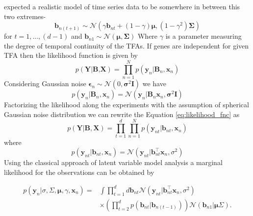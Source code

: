 \cite{Sanguinetti:2006}  expected a realistic model of time series data to be somewhere in between this two extremes-
\begin{equation} \label{eq:tfa_SanG_update}
  \textbf{b}_{n(t+1)} \sim \mathcal{N} (\gamma \textbf{b}_{nt} + (1-\gamma)\boldsymbol{\mu},(1-\gamma^2)\boldsymbol{\Sigma})
\end{equation}
for $ t= 1, ... , (d-1)$ and $ \textbf{b}_{n1} \sim \mathcal{N} ( \boldsymbol{\mu},\boldsymbol{\Sigma})$
Where $\gamma$ is a parameter measuring the degree of temporal continuity of the TFAs. If genes are independent for given TFA then the likelihood function is given by
\begin{equation} \label{eq:likelihood_fnc}
  p\left(\textbf{Y}|\textbf{B,X}\right)= \prod_{n \mathop = 1}^{N} p\left(\textbf{y}_n|\textbf{B}_n,\textbf{x}_n\right)
\end{equation}
Considering Gaussian noise $\boldsymbol{\epsilon}_n \sim \mathcal{N} \left(0,\boldsymbol{\sigma}^2\textbf{I}\right)$
we have
\begin{equation} \label{eq:likelihood_fnc_SingleGene}
  p\left(\textbf{y}_n|\textbf{B}_n,\textbf{x}_n\right)= \mathcal{N} \left(\textbf{y}_n|\textbf{B}_n \textbf{x}_n, \boldsymbol{\sigma}^2\textbf{I} \right)
\end{equation}
Factorizing the likelihood along the experiments with the assumption of spherical Gaussian noise distribution we can rewrite the Equation \ref{eq:likelihood_fnc} as
\begin{equation} \label{eq:likelihood_factorize}
  p\left(\textbf{Y}|\textbf{B},\textbf{X}\right)= 
     \prod_{t \mathop = 1}^{d} \prod_{n \mathop = 1}^{N} p\left(\textbf{y}_{nt}|\textbf{b}_{nt},\textbf{x}_n\right)
\end{equation}
where
\begin{equation} \label{eq:likelihood_fnc_allGene}
  p\left(\textbf{y}_{nt}|\textbf{b}_{nt},\textbf{x}_n\right)= \mathcal{N} \left(\textbf{y}_{nt}|\textbf{b}^\top_{nt}\textbf{x}_n,\sigma^2 \right)
\end{equation}
Using the classical approach of latent variable model analysis a marginal likelihood for the observations can be obtained by

\begin{equation} \label{eq:marginal_likelihood_tfa}
\begin{aligned}
p\left(\textbf{y}_n|\sigma,\Sigma,\boldsymbol{\mu},\gamma,\textbf{x}_n\right) = &
\int \prod^{d}_{t=1} d\textbf{b}_{nt}\mathcal{N} \left(\textbf{y}_{nt}|\textbf{b}^\top_{nt}\textbf{x}_n, \sigma^2 \right)\\
& \times \left( \prod^{d}_{t=2} p\left(\textbf{b}_{nt}|\textbf{b}_{n(t-1)}\right) \right)
\mathcal{N} \left(\textbf{b}_{n1}|\boldsymbol{\mu}\Sigma \right).
\end{aligned}
\end{equation}

